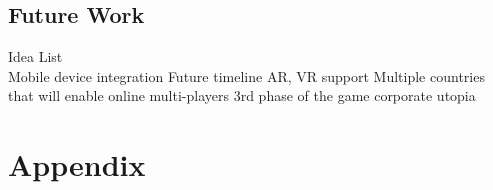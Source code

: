 \documentclass[11pt,titlepage,oneside,openany]{book}
\begin{document}
\section{Future Work}
\label{sec:future}
Idea List\\
Mobile device integration
Future timeline
AR, VR support
Multiple countries that will enable online multi-players
3rd phase of the game corporate utopia




\appendix

\chapter{Appendix}
\label{cha:appendix-a}

\newpage


\pagestyle{empty}
\end{document}
